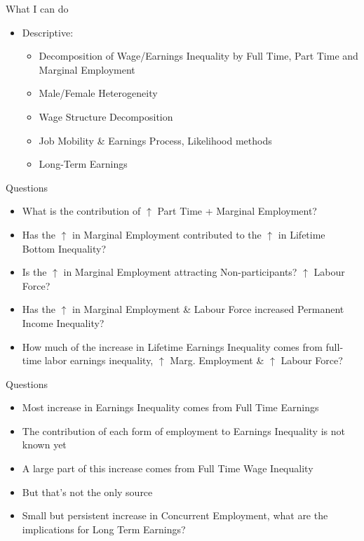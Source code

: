 \documentclass[hyperref={bookmarks=false}]{beamer}
\let\oldcite=\cite
\renewcommand{\cite}[1]{\textcolor[rgb]{.0,.2,.7}{\oldcite{#1}}}
\begin{document}
\begin{frame}{What I can do}
\begin{itemize}
\vfill
\item Descriptive:
\begin{itemize}
\item Decomposition of Wage/Earnings Inequality by Full Time, Part Time and Marginal Employment
\item Male/Female Heterogeneity
\item Wage Structure Decomposition \cite{CaHeKl13}
\item Job Mobility \& Earnings Process, Likelihood methods
\item Long-Term Earnings
\end{itemize}
\end{itemize}
\end{frame}

\begin{frame}{Questions}
\begin{itemize}
\setlength{\itemsep}{0.5 cm}
\item What is the contribution of $\uparrow$ Part Time + Marginal Employment?
\item Has the $\uparrow$ in Marginal Employment contributed to the $\uparrow$ in Lifetime Bottom Inequality?
\item Is the $\uparrow$ in Marginal Employment attracting Non-participants? $\uparrow$ Labour Force?
\item Has the $\uparrow$ in Marginal Employment \& Labour Force increased Permanent Income Inequality?
\item How much of the increase in Lifetime Earnings Inequality comes from full-time labor earnings inequality, $\uparrow$ Marg. Employment \& $\uparrow$ Labour Force?
\end{itemize}
\end{frame}


\begin{frame}{Questions}
\begin{itemize}
\setlength{\itemsep}{0.5 cm}
\item Most increase in Earnings Inequality comes from Full Time Earnings
\item The contribution of each form of employment to Earnings Inequality is not known yet
\item A large part of this increase comes from Full Time Wage Inequality
\item But that's not the only source
\item Small but persistent increase in Concurrent Employment, what are the implications for Long Term Earnings?
\end{itemize}
\end{frame}
\end{document}
